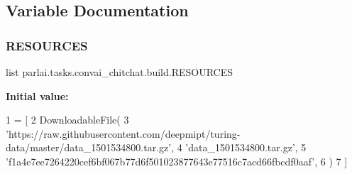 \subsection{Variable Documentation}
\mbox{\label{namespaceparlai_1_1tasks_1_1convai__chitchat_1_1build_a687e95f80a9c6975e5ad72cb5ff3c93b}} 
\subsubsection{\texorpdfstring{R\+E\+S\+O\+U\+R\+C\+ES}{RESOURCES}}
{\footnotesize\ttfamily list parlai.\+tasks.\+convai\+\_\+chitchat.\+build.\+R\+E\+S\+O\+U\+R\+C\+ES}

{\bfseries Initial value\+:}
\begin{DoxyCode}
1 =  [
2     DownloadableFile(
3         \textcolor{stringliteral}{'https://raw.githubusercontent.com/deepmipt/turing-data/master/data\_1501534800.tar.gz'},
4         \textcolor{stringliteral}{'data\_1501534800.tar.gz'},
5         \textcolor{stringliteral}{'f1a4e7ee7264220cef6bf067b77d6f501023877643e77516c7acd66fbcdf0aaf'},
6     )
7 ]
\end{DoxyCode}
